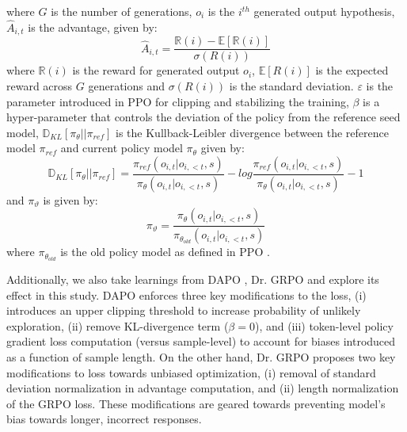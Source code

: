 \documentclass[conference]{IEEEtran}
\begin{document}
where $G$ is the number of generations, $o_i$ is the $i^{th}$ generated output hypothesis, $\hat{A}_{i,t}$ is the advantage, given by:
\begin{equation}
\hat{A}_{i,t} = \frac{\mathbb{R}(i) - \mathbb{E}[\mathbb{R}(i)]}{\sigma(R(i))}
\end{equation}
where $\mathbb{R}(i)$ is the reward for generated output $o_i$, $\mathbb{E}[R(i)]$ is the expected reward across $G$ generations and $\sigma(R(i))$ is the standard deviation.
$\varepsilon$ is the parameter introduced in PPO \cite{schulman2017proximal} for clipping and stabilizing the training, $\beta$ is a hyper-parameter that controls the deviation of the policy from the reference seed model, $\mathbb{D}_{KL}[\pi_{\theta}||\pi_{ref}]$ is the Kullback-Leibler divergence between the reference model $\pi_{ref}$ and current policy model $\pi_{\theta}$ given by:
\begin{equation}
\mathbb{D}_{KL}[\pi_{\theta}||\pi_{ref}] = \frac{\pi_{ref}(o_{i,t}|o_{i,<t}, s)}{\pi_{\theta}(o_{i,t}|o_{i, <t}, s)} - log \frac{\pi_{ref}(o_{i,t}|o_{i,<t}, s)}{\pi_{\theta}(o_{i,t}|o_{i, <t}, s)} - 1
\end{equation}
and $\pi_{\vartheta}$ is given by:
\begin{equation}
\pi_{\vartheta} = \frac{\pi_{\theta}(o_{i,t}|o_{i,<t}, s)}{\pi_{\theta_{old}}(o_{i,t}|o_{i, <t}, s)}
\end{equation}
where $\pi_{\theta_{old}}$ is the old policy model as defined in PPO \cite{schulman2017proximal}.

Additionally, we also take learnings from DAPO \cite{yu2025dapo}, Dr. GRPO \cite{liu2025understanding} and explore its effect in this study.
DAPO enforces three key modifications to the loss, (i) introduces an upper clipping threshold to increase probability of unlikely exploration, (ii) remove KL-divergence term ($\beta = 0$), and (iii) token-level policy gradient loss computation (versus sample-level) to account for biases introduced as a function of sample length.
On the other hand, Dr. GRPO proposes two key modifications to loss towards unbiased optimization, (i) removal of standard deviation normalization in advantage computation, and (ii) length normalization of the GRPO loss.
These modifications are geared towards preventing model's bias towards longer, incorrect responses.
\end{document}
